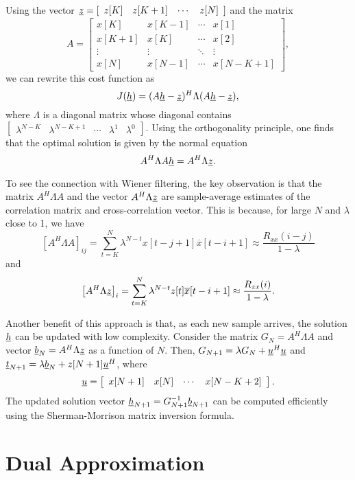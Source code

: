 Using the vector $\underline{z} = [ \begin{array}{cccc} z[K] & z[K+1] & \cdots & z[N] \end{array} ]$ and the matrix
\[ A = \left[ \begin{array}{cccc} x[K] & x[K-1] & \cdots & x[1] \\ x[K+1] & x[K] & \cdots & x[2] \\ \vdots & \vdots & \ddots & \vdots \\ x[N] & x[N-1] & \cdots & x[N-K+1] \end{array} \right], \]
we can rewrite this cost function as
\[ J(\underline{h}) = (A\underline{h}-\underline{z})^H \Lambda (A\underline{h}-\underline{z}), \]
where $\Lambda$ is a diagonal matrix whose diagonal contains $ [ \begin{array}{ccccc} \lambda^{N-K} & \lambda^{N-K+1} & \cdots & \lambda^1 & \lambda^0 \end{array} ]$.
Using the orthogonality principle, one finds that the optimal solution is given by the normal equation
\[ A^H \Lambda A \underline{h} = A^H \Lambda \underline{z}. \]

To see the connection with Wiener filtering, the key observation is that the matrix $A^H \Lambda A$ and the vector $ A^H \Lambda \underline{z}$ are sample-average estimates of the correlation matrix and cross-correlation vector.
This is because, for large $N$ and $\lambda$ close to 1, we have
\[ \left[ A^H \Lambda A \right]_{ij} = \sum_{t=K}^N \lambda^{N-t} x[t-j+1] \overline{x}[t-i+1] \approx \frac{R_{xx}(i-j)}{1-\lambda} \]
and
\[ \left[ A^H \Lambda \underline{z} \right]_i = \sum_{t=K}^N \lambda^{N-t} z[t] \overline{x}[t-i+1] \approx \frac{R_{zx}(i)}{1-\lambda}. \]

Another benefit of this approach is that, as each new sample arrives, the solution $\underline{h}$ can be updated with low complexity.
Consider the matrix $G_N = A^H \Lambda A$ and vector $\underline{b}_N = A^H \Lambda \underline{z}$ as a function of $N$.
Then, $G_{N+1} = \lambda G_N + \underline{u}^H \underline{u}$ and $\underline{t}_{N+1} = \lambda \underline{b}_N + z[N+1] \underline{u}^H$, where
\[ \underline{u} = \left[ \begin{array}{cccc} x[N+1] & x[N] & \cdots & x[N-K+2] \end{array} \right]. \]
The updated solution vector $\underline{h}_{N+1} = G_{N+1}^{-1} \underline{b}_{N+1}$ can be computed efficiently using the Sherman-Morrison matrix inversion formula.


\section{Dual Approximation}

